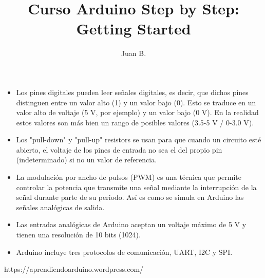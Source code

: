 \documentclass[12pt]{article}
\title{Curso Arduino Step by Step: Getting Started}
\author{Juan B.}
\begin{document}
    \begin{itemize}
        \item Los pines digitales pueden leer señales digitales, es decir, que dichos pines distinguen entre un valor alto (1) y un valor bajo (0). Esto se traduce en un valor alto de voltaje (5 V, por ejemplo) y un valor bajo (0 V). En la realidad estos valores son más bien un rango de posibles valores (3.5-5 V / 0-3.0 V).
        \item Los "pull-down" y "pull-up" resistors se usan para que cuando un circuito esté abierto, el voltaje de los pines de entrada no sea el del propio pin (indeterminado) si no un valor de referencia.
        \item La modulación por ancho de pulsos (PWM) es una técnica que permite controlar la potencia que transmite una señal mediante la interrupción de la señal durante parte de su periodo. Así es como se simula en Arduino las señales analógicas de salida.
        \item Las entradas analógicas de Arduino aceptan un voltaje máximo de 5 V y tienen una resolución de 10 bits (1024).
		\item Arduino incluye tres protocolos de comunicación, UART, I2C y SPI.
    \end{itemize}

    https://aprendiendoarduino.wordpress.com/
\end{document}
